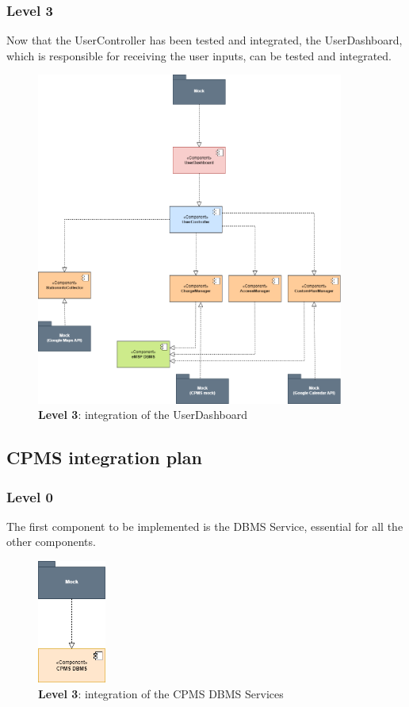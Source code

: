 \documentclass[12pt]{report}
\begin{document}
\subsubsection{Level 3}
Now that the UserController has been tested and integrated, the UserDashboard, which is responsible for receiving the user inputs, can be tested and integrated.

\bigskip
\begin{figure}[ht]
    \centering
    \includegraphics[width=0.9\textwidth]{assets/level3_emsp_integration.png}
    \caption{\textbf{Level 3}: integration of the UserDashboard}
    \label{fig:my_label423331333}
\end{figure}
\clearpage


\subsection{CPMS integration plan}

\subsubsection{Level 0}
The first component to be implemented is the DBMS Service, essential for all the other components.

\bigskip
\begin{figure}[ht]
    \centering
    \includegraphics[width=0.2\textwidth]{assets/level0_CPMS_integration.png}
    \caption{\textbf{Level 3}: integration of the CPMS DBMS Services}
    \label{fig:my_label423377731333}
\end{figure}
\clearpage
\end{document}
